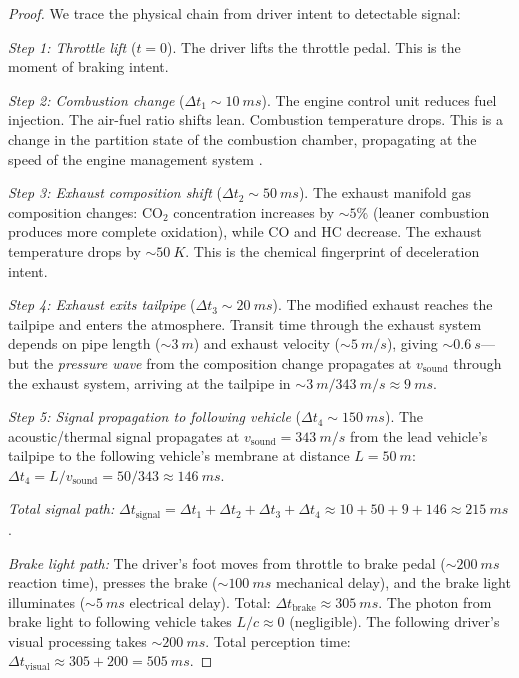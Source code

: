 \documentclass[11pt,twocolumn,a4paper]{article}
\theoremstyle{plain}
\theoremstyle{definition}
\theoremstyle{remark}
\begin{document}
\begin{proof}
We trace the physical chain from driver intent to detectable signal:

\emph{Step 1: Throttle lift} ($t = 0$). The driver lifts the throttle pedal. This is the moment of braking intent.

\emph{Step 2: Combustion change} ($\Delta t_1 \sim \SI{10}{ms}$). The engine control unit reduces fuel injection. The air-fuel ratio shifts lean. Combustion temperature drops. This is a change in the partition state of the combustion chamber, propagating at the speed of the engine management system \cite{heywood2018internal}.

\emph{Step 3: Exhaust composition shift} ($\Delta t_2 \sim \SI{50}{ms}$). The exhaust manifold gas composition changes: CO$_2$ concentration increases by $\sim 5\%$ (leaner combustion produces more complete oxidation), while CO and HC decrease. The exhaust temperature drops by $\sim \SI{50}{K}$. This is the chemical fingerprint of deceleration intent.

\emph{Step 4: Exhaust exits tailpipe} ($\Delta t_3 \sim \SI{20}{ms}$). The modified exhaust reaches the tailpipe and enters the atmosphere. Transit time through the exhaust system depends on pipe length ($\sim \SI{3}{m}$) and exhaust velocity ($\sim \SI{5}{m/s}$), giving $\sim \SI{0.6}{s}$---but the \emph{pressure wave} from the composition change propagates at $v_{\mathrm{sound}}$ through the exhaust system, arriving at the tailpipe in $\sim \SI{3}{m}/\SI{343}{m/s} \approx \SI{9}{ms}$.

\emph{Step 5: Signal propagation to following vehicle} ($\Delta t_4 \sim \SI{150}{ms}$). The acoustic/thermal signal propagates at $v_{\mathrm{sound}} = \SI{343}{m/s}$ from the lead vehicle's tailpipe to the following vehicle's membrane at distance $L = \SI{50}{m}$: $\Delta t_4 = L/v_{\mathrm{sound}} = 50/343 \approx \SI{146}{ms}$.

\emph{Total signal path:} $\Delta t_{\mathrm{signal}} = \Delta t_1 + \Delta t_2 + \Delta t_3 + \Delta t_4 \approx 10 + 50 + 9 + 146 \approx \SI{215}{ms}$.

\emph{Brake light path:} The driver's foot moves from throttle to brake pedal ($\sim \SI{200}{ms}$ reaction time), presses the brake ($\sim \SI{100}{ms}$ mechanical delay), and the brake light illuminates ($\sim \SI{5}{ms}$ electrical delay). Total: $\Delta t_{\mathrm{brake}} \approx \SI{305}{ms}$. The photon from brake light to following vehicle takes $L/c \approx 0$ (negligible). The following driver's visual processing takes $\sim \SI{200}{ms}$. Total perception time: $\Delta t_{\mathrm{visual}} \approx 305 + 200 = \SI{505}{ms}$.


\end{proof}
\end{document}
